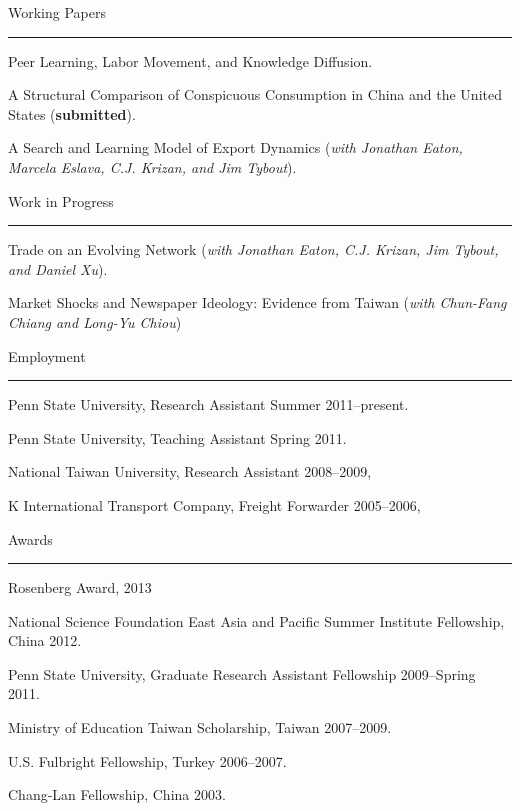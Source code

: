 \documentclass[letterpaper]{article}
\renewenvironment{itemize}{
    \begin{list}{}{
            \setlength{\leftmargin}{1.5em}
            \setlength{\parskip}{0pt}
            \setlength{\parsep}{0pt}
        }
    }{
    \end{list}
}
\begin{document}
\vspace{4mm}
{\Large Working Papers}
\vspace{1mm}
\hrule
\begin{itemize}
    \item Peer Learning, Labor Movement, and Knowledge Diffusion.
    \item A Structural Comparison of Conspicuous Consumption in China and the United States (\textbf{submitted}).
    \item A Search and Learning Model of Export Dynamics (\emph{with Jonathan Eaton, Marcela Eslava, C.J. Krizan, and Jim Tybout}).
\end{itemize}

\vspace{4mm}
{\Large Work in Progress}
\vspace{1mm}
\hrule
\begin{itemize}
    \item Trade on an Evolving Network (\emph{with Jonathan Eaton, C.J. Krizan, Jim Tybout, and Daniel Xu}).
    \item Market Shocks and Newspaper Ideology: Evidence from Taiwan (\emph{with Chun-Fang Chiang and Long-Yu Chiou})
\end{itemize}

\vspace{4mm}
{\Large Employment}
\hrule
\begin{itemize}
    \item Penn State University, Research Assistant Summer 2011--present.
    \item Penn State University, Teaching Assistant Spring 2011.
    \item National Taiwan University, Research Assistant 2008--2009,
    \item K International Transport Company, Freight Forwarder 2005--2006,
\end{itemize}

\vspace{4mm}
{\Large Awards}
\vspace{1mm}
\hrule
\begin{itemize}
    \item Rosenberg Award, 2013
    \item National Science Foundation East Asia and Pacific Summer Institute Fellowship, China 2012.
    \item Penn State University, Graduate Research Assistant Fellowship 2009--Spring 2011.
    \item Ministry of Education Taiwan Scholarship, Taiwan 2007--2009.
    \item U.S. Fulbright Fellowship, Turkey 2006--2007.
    \item Chang-Lan Fellowship, China 2003.
\end{itemize}
\end{document}
